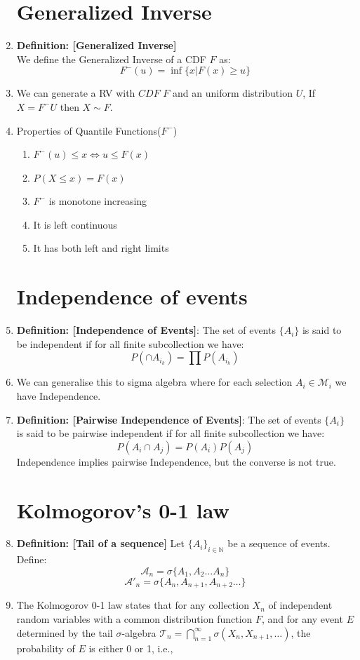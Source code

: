 \documentclass[12pt,oneside]{book}
\begin{document}
\begin{enumerate}
    \section{Generalized Inverse}
    \item \textbf{Definition: [Generalized Inverse]}\\We define the Generalized Inverse of a CDF $F$ as:
    $$F^{-}(u)=\inf\{x|F(x)\geq u\}$$
    \item We can generate a RV with $CDF$ $F$ and an uniform distribution $U$, If $X=F^{-}U$ then $X\sim F$.
    \item Properties of Quantile Functions($F^-$)
    \begin{enumerate}
        \item $F^-(u)\leq x\Leftrightarrow u\leq F(x)$
        \item $P(X\leq x)=F(x)$
        \item $F^-$ is monotone increasing
        \item It is left continuous
        \item It has both left and right limits
    \end{enumerate}
    \section{Independence of events}
    \item \textbf{Definition: [Independence of Events]}:
    The set of events $\{A_i\}$ is said to be independent if for all finite subcollection we have:
    $$P\left(\cap A_{i_k}\right)=\prod P(A_{i_k})$$ 
    \item We can generalise this to sigma algebra where for each selection $A_i\in\mathcal M_i$ we have Independence.
    \item \textbf{Definition: [Pairwise Independence of Events]}:
    The set of events $\{A_i\}$ is said to be pairwise independent if for all finite subcollection we have:
    $$P( A_{i}\cap A_j)= P(A_i)P(A_j)$$ 
    Independence implies pairwise Independence, but the converse is not true.
    \section{Kolmogorov's 0-1 law}
    \item \textbf{Definition: [Tail of a sequence]}
    Let $\{A_i\}_{i\in\mathbb N}$ be a sequence of events. Define:
    $$\mathcal{A}_n=\sigma\{A_1,A_2\hdots A_n\}$$
    $$\mathcal{A}'_n=\sigma\{A_n,A_{n+1},A_{n+2}\hdots\}$$
    \item The Kolmogorov 0-1 law states that for any collection ${X_n}$ of independent random variables with a common distribution function $F$, and for any event $E$ determined by the tail $\sigma$-algebra $\mathcal{T}_n=\bigcap_{n=1}^\infty \sigma(X_n,X_{n+1},\dots)$, the probability of $E$ is either 0 or 1, i.e.,


\end{enumerate}
\end{document}
